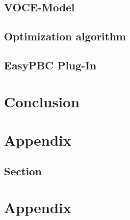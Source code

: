 \documentclass[
		11pt,
		a4paper,
		titlepage=firstiscover,
	]{scrreprt}
\renewcommand{\headrulewidth}{0.4pt}
\renewcommand{\chaptermark}[1]{\markboth{\thechapter\ #1}{}}
\renewcommand{\sectionmark}[1]{\markright{\thesection\ #1}}
\renewcommand{\headrulewidth}{0pt}
\begin{document}
 

    
    
    \section{VOCE-Model}
    \section{Optimization algorithm}
    \section{EasyPBC Plug-In}

    
    
    
    
    \chapter{Conclusion}
	

	
	
	
	\clearpage
	\newpage
	
	\pagestyle{fancy}
	\fancyhead{}
	\fancyfoot{}
	\fancyhead[R]{\rightmark}
	\renewcommand{\headrulewidth}{0.4pt}
	\fancyfoot[R]{\thepage}
	\renewcommand{\chaptermark}[1]{\markboth{\thechapter\ #1}{}}
	\renewcommand{\sectionmark}[1]{\markright{\thesection\ #1}}
	
	
	\newpage
	
	 \begin{appendices}
	 	\chapter{Appendix}
	 	\section{Section}
	 	\chapter{Appendix}
	\end{appendices}
	
	
\end{document}

